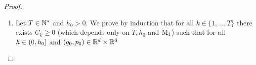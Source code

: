 \begin{proof}
  \begin{enumerate}[label={(\roman*)},wide=0pt, labelindent=\parindent]
  \item Let $T \in \mathbb{N}^{*}$ and $h_0 >0$.  We prove by induction that for all $k \in \{1,\ldots,T\}$ there exists $C_k \geq 0$ (which depends only on $T,h_0$
and $\mathrm{M}_1$) such that for all $h \in \left(0,h_0\right]$ and
  $(q_0,p_0) \in \mathbb{R}^d \times \mathbb{R}^d$
\begin{equation}
\label{lem:bound_first_iterate_leapfrog_1_q}

\end{equation}
\end{enumerate}
\end{proof}
